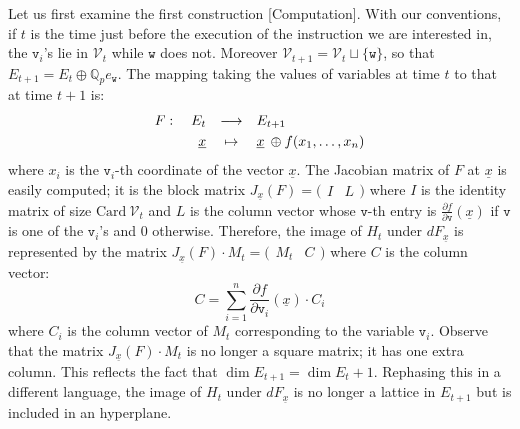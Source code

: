 \documentclass[sigconf]{acmart}
\newcommand{\Q}{\mathbb Q}
\newcommand{\Qp}{\Q_p}
\newcommand{\calV}{\mathcal{V}}
\newcommand{\ttv}{\texttt{v}\xspace}
\newcommand{\ttw}{\texttt{w}\xspace}
\theoremstyle{definition}
\begin{document}
Let us first examine the first construction [Computation].
With our conventions, if $t$ is the time just before the execution of 
the instruction we are interested in, the $\ttv_i$'s lie in $\calV_t$ 
while $\ttw$ does not. Moreover $\calV_{t+1} = \calV_t \sqcup \{\ttw\}$, 
so that $E_{t+1} = E_t \oplus \Qp e_\ttw$.
The mapping taking the values of variables at time $t$ to that at 
time $t{+}1$ is:
$$\begin{array}{rcl}
F: \quad E_t & \longrightarrow & E_{t+1} \smallskip \\
\underline x & \mapsto & \underline x \:\oplus f(x_1, \ldots, x_n)
\end{array}$$
where $x_i$ is the $\ttv_i$-th coordinate of the vector $\underline x$.
The Jacobian matrix of $F$ at $\underline x$ is easily computed; it 
is the block matrix $J_{\underline x}(F) = \big( \begin{matrix} I & L
\end{matrix} \big)$ where $I$ is the identity matrix of size $\text{Card}
\:\calV_t$ and $L$ is the column vector whose $\ttv$-th entry is
$\frac{\partial f}{\partial \ttv} (\underline x)$ if $\ttv$ is one of 
the $\ttv_i$'s and $0$ otherwise.
Therefore, the image of $H_t$ under $dF_{\underline x}$ is represented 
by the matrix $J_{\underline x}(F) \cdot M_t = \big( \begin{matrix} M_t & C
\end{matrix} \big)$ where $C$ is the column vector:
$$C = \sum_{i=1}^n \frac{\partial f}{\partial{\ttv_i}} (\underline x)
\cdot C_i$$
where $C_i$ is the column vector of $M_t$ corresponding to the
variable $\ttv_i$.
Observe that the matrix $J_{\underline x}(F) \cdot M_t$ is no longer a 
square matrix; it has one extra column. This reflects the fact that 
$\dim E_{t+1} = \dim E_t + 1$. Rephasing this in a different language, 
the image of $H_t$ under $dF_{\underline x}$ is no longer a lattice in 
$E_{t+1}$ but is included in an hyperplane.
\end{document}
